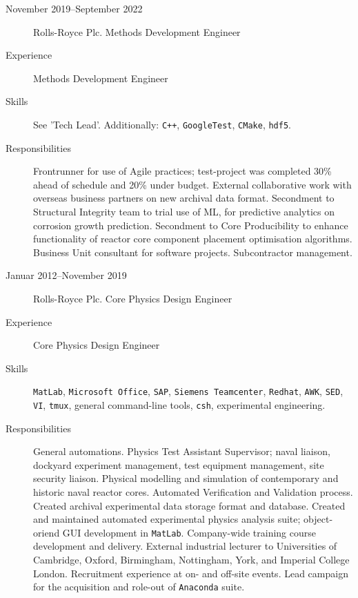 \documentclass[margin,line]{resume}
\begin{document}
\begin{resume}
\begin{description}
		\item[November 2019--September 2022] Rolls-Royce Plc. Methods Development Engineer

		\item[Experience] Methods Development Engineer
		\item[Skills] See 'Tech Lead'. Additionally: \texttt{C++},
		      \texttt{GoogleTest}, \texttt{CMake}, \texttt{hdf5}.
		\item[Responsibilities] Frontrunner for use of Agile practices;
		      test-project was completed 30\% ahead of schedule
		      and 20\% under budget.
		      External collaborative work with overseas business partners
		      on new archival data format.
		      Secondment to Structural Integrity team to trial use of \textsc{ML},
		      for predictive analytics on corrosion growth prediction.
		      Secondment to Core Producibility to enhance functionality
		      of reactor core component placement optimisation algorithms.
		      Business Unit consultant for software projects.
		      Subcontractor management.

		\item[Januar 2012--November 2019] Rolls-Royce Plc. Core Physics Design Engineer

		\item[Experience] Core Physics Design Engineer
		\item[Skills] \texttt{MatLab}, \texttt{Microsoft Office},
		      \texttt{SAP}, \texttt{Siemens Teamcenter}, \texttt{Redhat},
		      \texttt{AWK}, \texttt{SED}, \texttt{VI}, \texttt{tmux}, general command-line tools,
		      \texttt{csh}, experimental engineering.
		\item[Responsibilities] General automations.
		      Physics Test Assistant Supervisor; naval liaison, dockyard experiment management,
		      test equipment management, site security liaison.
		      Physical modelling and simulation of contemporary and historic naval reactor cores.
		      Automated Verification and Validation process.
		      Created archival experimental data storage format and database.
		      Created and maintained automated experimental physics analysis suite;
		      object-oriend GUI development in \texttt{MatLab}.
		      Company-wide training course development and delivery.
		      External industrial lecturer to Universities of Cambridge, Oxford, Birmingham,
		      Nottingham, York, and Imperial College London.
		      Recruitment experience at on- and off-site events.
		      Lead campaign for the acquisition and role-out of \texttt{Anaconda} suite.


\end{description}
\end{resume}
\end{document}

